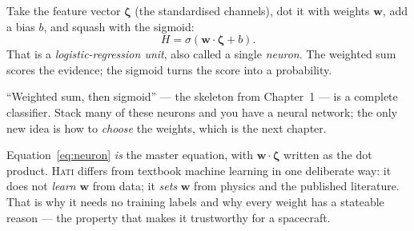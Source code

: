 \documentclass[11pt,oneside]{book}
\begin{document}
Take the feature vector $\boldsymbol\zeta$ (the standardised channels), dot it with
weights $\mathbf w$, add a bias $b$, and squash with the sigmoid:
\begin{equation}
H=\sigma(\mathbf w\cdot\boldsymbol\zeta+b).
\label{eq:neuron}
\end{equation}
That is a \emph{logistic-regression unit}, also called a single \emph{neuron}. The
weighted sum scores the evidence; the sigmoid turns the score into a probability.

\begin{center}
\end{center}

\begin{keyidea}
``Weighted sum, then sigmoid'' --- the skeleton from Chapter~1 --- is a complete
classifier. Stack many of these neurons and you have a neural network; the only new
idea is how to \emph{choose} the weights, which is the next chapter.
\end{keyidea}

\begin{hatibox}
Equation~\eqref{eq:neuron} \emph{is} the master equation, with $\mathbf w\cdot\boldsymbol
\zeta$ written as the dot product. \textsc{Hati} differs from textbook
machine learning in one deliberate way: it does not \emph{learn} $\mathbf w$ from data;
it \emph{sets} $\mathbf w$ from physics and the published literature. That is why it
needs no training labels and why every weight has a stateable reason --- the property
that makes it trustworthy for a spacecraft.
\end{hatibox}
\end{document}
